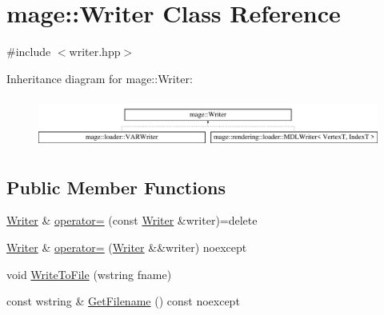\hypertarget{classmage_1_1_writer}{}\section{mage\+:\+:Writer Class Reference}
\label{classmage_1_1_writer}


{\ttfamily \#include $<$writer.\+hpp$>$}

Inheritance diagram for mage\+:\+:Writer\+:\begin{figure}[H]
\begin{center}
\leavevmode
\includegraphics[height=1.676647cm]{classmage_1_1_writer}
\end{center}
\end{figure}
\subsection*{Public Member Functions}
\begin{DoxyCompactItemize}
\item 
\mbox{\hyperlink{classmage_1_1_writer}{Writer}} \& \mbox{\hyperlink{classmage_1_1_writer_a81ea888d1b170515713432ca28629ceb}{operator=}} (const \mbox{\hyperlink{classmage_1_1_writer}{Writer}} \&writer)=delete
\item 
\mbox{\hyperlink{classmage_1_1_writer}{Writer}} \& \mbox{\hyperlink{classmage_1_1_writer_a03a93796179f22be90471bea0f7a7cf0}{operator=}} (\mbox{\hyperlink{classmage_1_1_writer}{Writer}} \&\&writer) noexcept
\item 
void \mbox{\hyperlink{classmage_1_1_writer_a9af5416468b0a51983d07aec8061eb27}{Write\+To\+File}} (wstring fname)
\item 
const wstring \& \mbox{\hyperlink{classmage_1_1_writer_aedbc8d5fa02444ecba2e040ca8e98281}{Get\+Filename}} () const noexcept
\end{DoxyCompactItemize}
